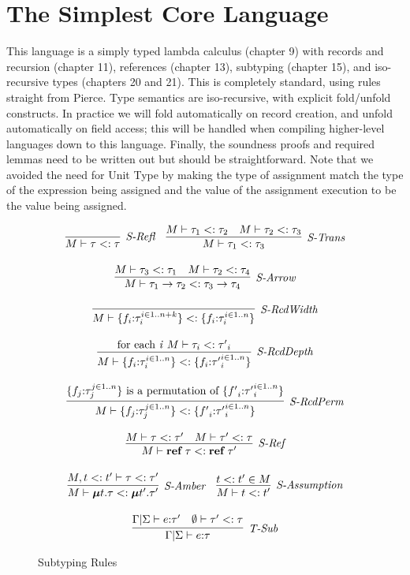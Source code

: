 \section{The Simplest Core Language}

This language is a simply typed lambda calculus (chapter 9)
with records and recursion (chapter 11), references (chapter 13),
subtyping (chapter 15), and iso-recursive types (chapters 20 and 21).
This is completely standard, using rules straight from Pierce.
Type semantics are iso-recursive, with explicit fold/unfold constructs.
In practice we will fold automatically on record creation, and unfold automatically on field access;
this will be handled when compiling higher-level languages down to this language.
Finally, the soundness proofs and required lemmas need to be written out but should be straightforward.
Note that we avoided the need for Unit Type by making the type of assignment match the type of the expression being assigned and the value of the assignment execution to be the value being assigned.





\begin{figure}
\centering
\[
\begin{array}{c}
\infer[\textit{S-Refl}]
	{M \vdash \tau <: \tau}
	{}
~~~
\infer[\textit{S-Trans}]
	{M \vdash \tau_1 <: \tau_3}
	{M \vdash \tau_1 <: \tau_2 & M \vdash \tau_2 <: \tau_3}
\\[3ex]
\infer[\textit{S-Arrow}]
	{M \vdash \tau_1 \rightarrow \tau_2 <: \tau_3 \rightarrow \tau_4}
	{M \vdash \tau_3 <: \tau_1 & M \vdash \tau_2 <: \tau_4}
\\[3ex]
\infer[\textit{S-RcdWidth}]
	{M \vdash \{ f_i{:}\tau_i ^{i \in 1..n+k} \} <: \{ f_i{:}\tau_i ^{i \in 1..n} \}}
	{}
\\[3ex]
\infer[\textit{S-RcdDepth}]
	{M \vdash \{ f_i{:}\tau_i ^{i \in 1..n} \} <: \{ f_i{:}{\tau'}_i ^{i \in 1..n} \}}
	{\textrm{for each \textit{i}} ~ M \vdash \tau_i <: {\tau'}_i}
\\[3ex]
\infer[\textit{S-RcdPerm}]
	{M \vdash \{ f_j{:}\tau_j ^{j \in 1..n} \} <: \{ {f'}_i{:}{\tau'}_i ^{i \in 1..n} \}}
	{\{ f_j{:}\tau_j ^{j \in 1..n} \} \textrm{ is a permutation of } \{ {f'}_i{:}{\tau'}_i ^{i \in 1..n} \}}
\\[3ex]
\infer[\textit{S-Ref}]
	{M \vdash \keyw{ref}~\tau <: \keyw{ref}~\tau'}
	{M \vdash \tau <: \tau' & M \vdash \tau' <: \tau}
\\[3ex]
\infer[\textit{S-Amber}]
	{M \vdash \boldsymbol\mu t.\tau <: \boldsymbol\mu t'.\tau'}
	{M, t <: t' \vdash \tau <: \tau'}
~~~
\infer[\textit{S-Assumption}]
	{M \vdash t <: t'}
	{t <: t' \in M}
\\[3ex]
\infer[\textit{T-Sub}]
	{\Gamma | \Sigma \vdash e{:}\tau}
	{\Gamma | \Sigma \vdash e{:}\tau' & \emptyset \vdash \tau' <: \tau}
\end{array}
\]
\caption{Subtyping Rules}
\end{figure}


